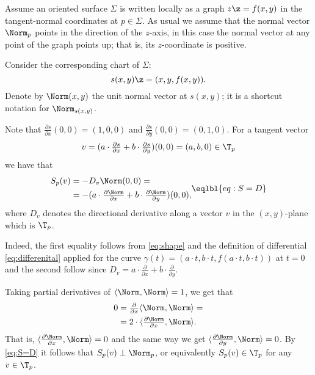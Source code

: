 Assume an oriented surface $\Sigma$ is written locally as a graph $z\z=f(x,y)$ in the tangent-normal coordinates at $p\in\Sigma$.
As usual we assume that the normal vector $\Norm_p$ points in the direction of the $z$-axis,
in this case the normal vector at any point of the graph points up; that is, its $z$-coordinate  is positive.

Consider the corresponding chart  of $\Sigma$:
\[s(x,y)\z=(x,y,f(x,y)).\]
Denote by $\Norm(x,y)$ the unit normal vector at $s(x,y)$; it is a shortcut notation for $\Norm_{s(x,y)}$.

Note that $\tfrac{\partial s}{\partial x}(0,0)=(1,0,0)$ and $\tfrac{\partial s}{\partial y}(0,0)=(0,1,0)$.
For a tangent vector 
\[v=(a\cdot\tfrac{\partial s}{\partial x}+b\cdot\tfrac{\partial s}{\partial y})(0,0) =(a,b,0)\in \T_p\]
we have that
\[
\begin{aligned}
S_p(v)&=-D_v\Norm(0,0)=
\\
&=-(a\cdot \tfrac{\partial \Norm}{\partial x}+b\cdot \tfrac{\partial \Norm}{\partial y})(0,0),
\end{aligned}
\eqlbl{eq:S=D}
\]
where $D_v$ denotes the directional derivative along a vector $v$ in the $(x,y)$-plane which is $\T_p$.

Indeed, the first equality follows from \ref{eq:shape} and the definition of differential \ref{eq:differenital} applied for the curve $\gamma(t)=(a\cdot t,b\cdot t, f(a\cdot t,b\cdot t))$ at $t=0$ and the second follow since
$D_v=a\cdot \tfrac{\partial }{\partial x}+b\cdot \tfrac{\partial }{\partial y}$.

Taking partial derivatives of $\langle\Norm,\Norm\rangle=1$, we get that 
\begin{align*}
0&=\tfrac{\partial}{\partial x} \langle\Norm,\Norm\rangle=
\\
&=2\cdot\langle\tfrac{\partial\Norm}{\partial x},\Norm\rangle.
\end{align*}
That is, $\langle\tfrac{\partial\Norm}{\partial x},\Norm\rangle=0$ and the same way we get $\langle\tfrac{\partial\Norm}{\partial y},\Norm\rangle=0$.
By \ref{eq:S=D} it follows that $S_p(v)\perp \Norm_p$, or equivalently $S_p(v)\in\T_p$ for any $v\in \T_p$.

